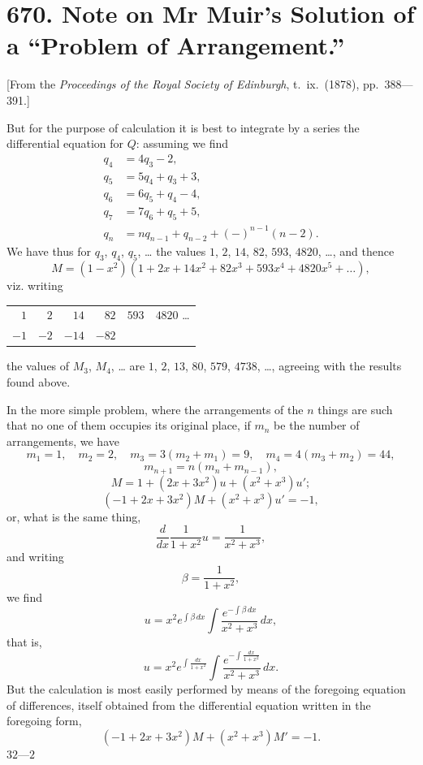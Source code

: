 \documentclass[11pt,a4paper]{book}
\begin{document}
\thispagestyle{empty}


\newpage


\section*{670. Note on Mr Muir's Solution of a ``Problem of Arrangement.''}

[From the \textit{Proceedings of the Royal Society of Edinburgh}, t.\ ix.\ (1878), pp.\ 388---391.]

\vspace{0.5em}
\noindent
But for the purpose of calculation it is best to integrate by a series the differential equation for $Q$: assuming we find
\begin{align*}
q_4 &= 4q_3 - 2,\\
q_5 &= 5q_4 + q_3 + 3,\\
q_6 &= 6q_5 + q_4 - 4,\\
q_7 &= 7q_6 + q_5 + 5,\\
q_n &= nq_{n-1} + q_{n-2} + (-)^{n-1}(n-2).
\end{align*}
We have thus for $q_3$, $q_4$, $q_5$, \dots{} the values $1$, $2$, $14$, $82$, $593$, $4820$, \dots{}, and thence
\[
M = (1 - x^2)(1 + 2x + 14x^2 + 82x^3 + 593x^4 + 4820x^5 + \dots),
\]
viz. writing
\begin{center}
\begin{tabular}{rrrrrr}
$1$ & $2$ & $14$ & $82$ & $593$ & $4820$ \dots\\
$-1$ & $-2$ & $-14$ & $-82$
\end{tabular}
\end{center}
the values of $M_3$, $M_4$, \dots{} are $1$, $2$, $13$, $80$, $579$, $4738$, \dots{}, agreeing with the results found above.

In the more simple problem, where the arrangements of the $n$ things are such that no one of them occupies its original place, if $m_n$ be the number of arrangements, we have
\[
m_1 = 1, \quad m_2 = 2, \quad m_3 = 3(m_2 + m_1) = 9, \quad m_4 = 4(m_3 + m_2) = 44,
\]
\[
m_{n+1} = n(m_n + m_{n-1}),
\]
\[
M = 1 + (2x + 3x^2)u + (x^2 + x^3)u';
\]
\[
(-1 + 2x + 3x^2)M + (x^2 + x^3)u' = -1,
\]
or, what is the same thing,
\[
\frac{d}{dx}\frac{1}{1+x^2}u = \frac{1}{x^2+x^3},
\]
and writing
\[
\beta = \frac{1}{1+x^2},
\]
we find
\[
u = x^2 e^{\int \beta \, dx} \int \frac{e^{-\int \beta \, dx}}{x^2+x^3} \, dx,
\]
that is,
\[
u = x^2 e^{\int \frac{dx}{1+x^2}} \int \frac{e^{-\int \frac{dx}{1+x^2}}}{x^2+x^3} \, dx.
\]
But the calculation is most easily performed by means of the foregoing equation of differences, itself obtained from the differential equation written in the foregoing form,
\[
(-1 + 2x + 3x^2)M + (x^2 + x^3)M' = -1.
\]
\hfill $32\text{---}2$
\end{document}
